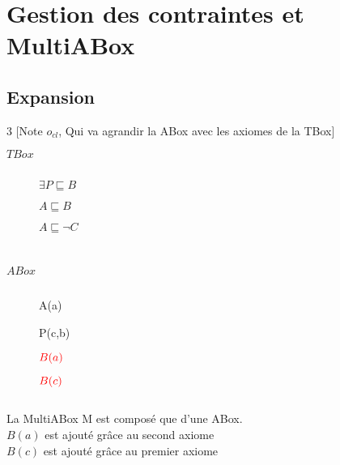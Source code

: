 \section{Gestion des contraintes et MultiABox}
\subsection{Expansion}

\begin{multicols}{3}
[Note $o_{cl}$, Qui va agrandir la ABox avec les axiomes de la TBox]
\begin{description}
\item[$TBox$] $ $
\item[] $\exists P \sqsubseteq B$
\item[] $A \sqsubseteq B$
\item[] $A \sqsubseteq \neg C$
\item[] $ $
\item[] $ $
\end{description}
\begin{description}
\item[$ABox$] $ $
\item[] A(a)
\item[] P(c,b)
\item[] $\textcolor{red}{B(a)}$
\item[] $\textcolor{red}{B(c)}$
\item[] $ $
\end{description}
La MultiABox M est composé que d'une ABox.\\
$B(a)$ est ajouté grâce au second axiome\\
$B(c)$ est ajouté grâce au premier axiome\\\\\\
\end{multicols}

